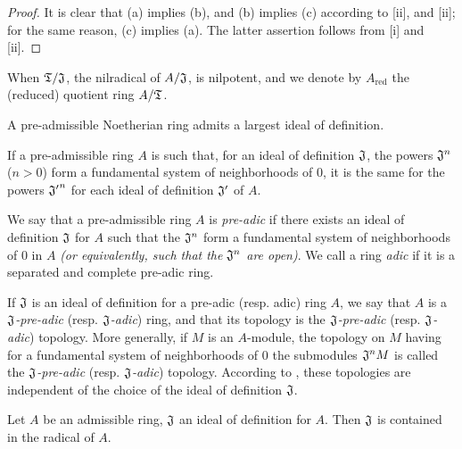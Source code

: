 \begin{proof}
\label{proof-0.7.1.6}
It is clear that (a) implies (b), and (b) implies (c) according to
[ii], and [ii]; for the same
reason, (c) implies (a). The latter assertion follows from [i] and
[ii].
\end{proof}

When $\mathfrak{T}/\mathfrak{J}$, the nilradical of $A/\mathfrak{J}$, is
nilpotent, and we denote by $A_\text{red}$ the (reduced) quotient ring
$A/\mathfrak{T}$.

\begin{cor}[7.1.7]
\label{0.7.1.7}
A pre-admissible Noetherian ring admits a largest ideal of definition.
\end{cor}

\begin{cor}[7.1.8]
\label{0.7.1.8}
If a pre-admissible ring $A$ is such that, for an ideal of definition
$\mathfrak{J}$, the powers $\mathfrak{J}^n$ ($n>0$) form a fundamental system
of neighborhoods of $0$, it is the same for the powers ${\mathfrak{J}'}^n$ for
each ideal of definition $\mathfrak{J}'$ of $A$.
\end{cor}

\begin{defn}[7.1.9]
\label{0.7.1.9}
We say that a pre-admissible ring $A$ is {\em pre-adic} if there exists an
ideal of definition $\mathfrak{J}$ for $A$ such that the $\mathfrak{J}^n$ form
a fundamental system of neighborhoods of $0$ in $A$ {\em (or equivalently, such
that the $\mathfrak{J}^n$ are {\em open})}. We call a ring {\em adic} if it
is a separated and complete pre-adic ring.
\end{defn}

If $\mathfrak{J}$ is an ideal of definition for a pre-adic (resp. adic) ring
$A$, we say that $A$ is a {\em $\mathfrak{J}$-pre-adic}
(resp. {\em $\mathfrak{J}$-adic}) ring, and that its topology is the
{\em $\mathfrak{J}$-pre-adic} (resp. {\em $\mathfrak{J}$-adic}) topology. More
generally, if $M$ is an $A$-module, the topology on $M$ having for a fundamental
system of neighborhoods of $0$ the submodules $\mathfrak{J}^n M$ is called the
{\em $\mathfrak{J}$-pre-adic} (resp. {\em $\mathfrak{J}$-adic}) topology.
According to , these topologies are independent of the choice
of the ideal of definition $\mathfrak{J}$.

\begin{prop}[7.1.10]
\label{0.7.1.10}
Let $A$ be an admissible ring, $\mathfrak{J}$ an ideal of definition for $A$.
Then $\mathfrak{J}$ is contained in the radical of $A$.
\end{prop}

